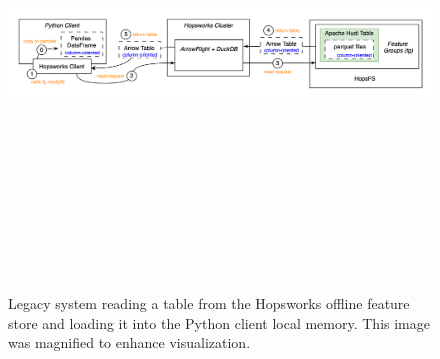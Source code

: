\begin{figure}
    \begin{center}
      \includegraphics[angle=90,origin=c,keepaspectratio,height=12.5cm]{figures/2-background/FeatureStore-reading.png}
    \end{center}
    \caption[Legacy system - Read process - Magnified diagram]{Legacy system reading a table from the Hopsworks offline feature store and loading it into the Python client local memory. This image was magnified to enhance visualization.}
    \label{fig:appx_featurestore_reading}
\end{figure}